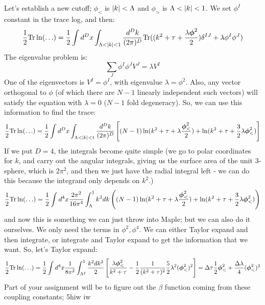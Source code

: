 Let's establish a new cutoff; $\phi_<$ is $\lvert k \rvert < \Lambda$ and $\phi_>$ is $\Lambda < \lvert k \rvert < 1$. We set $\phi^I$ constant in the trace log, and then:
\begin{equation}
    \frac{1}{2}\Tr \ln (\ldots) = \frac{1}{2}\int d^Dx \int_{\Lambda < \abs{k} < 1} \frac{d^Dk}{(2\pi)^D}\Tr((k^2 + \tau + \frac{\lambda\gv{\phi}^2}{2})\delta^{IJ} + \lambda\phi^I\phi^J)
\end{equation}
The eigenvalue problem is:
\begin{equation}
    \sum_J \phi^I \phi^J V^J = \lambda V^I
\end{equation}
One of the eigenvectors is $V^I = \phi^I$, with eigenvalue $\lambda = \phi^2$. Also, any vector orthogonal to $\phi$ (of which there are $N - 1$ linearly independent such vectors) will satisfy the equation with $\lambda = 0$ ($N-1$ fold degeneracy). So, we can use this information to find the trace:
\begin{equation}
    \frac{1}{2}\Tr \ln (\ldots) = \frac{1}{2}\int d^Dx \int_{\Lambda < \abs{k} < 1} \frac{d^Dk}{(2\pi)^D}\left[(N-1)\ln(k^2 + \tau + \lambda\frac{\gv{\phi}_<^2}{2}) + \ln(k^2 + \tau + \frac{3}{2}\lambda \gv{\phi}_<^2)\right]
\end{equation}
If we put $D = 4$, the integrals become quite simple (we go to polar coordinates for $k$, and carry out the angular integrals, giving us the surface area of the unit $3$-sphere, which is $2\pi^2$, and then we just have the radial integral left - we can do this because the integrand only depends on $k^2$.)
\begin{equation}
    \frac{1}{2}\Tr \ln (\ldots) = \frac{1}{2}\int d^4x \frac{2\pi^2}{16\pi^4} \int_\Lambda^1 k^3 dk \left((N-1)\ln(k^2 + \tau + \lambda\frac{\gv{\phi}_<^2}{2}) + \ln(k^2 + \tau + \frac{3}{2}\lambda \gv{\phi}_<^2)\right)
\end{equation}
and now this is something we can just throw into Maple; but we can also do it ourselves. We only need the terms in $\phi^2, \phi^4$. We can either Taylor expand and then integrate, or integrate and Taylor expand to get the information that we want. So, let's Taylor expand:
\begin{equation}
    \frac{1}{2}\Tr \ln (\ldots) = \frac{1}{2}\int d^4x \frac{1}{8\pi^2}\int_{\Lambda^2}^1 \frac{k^2dk^2}{2} \left[\frac{\lambda \gv{\phi}_<^2}{k^2 + \tau} - \frac{1}{2}\frac{1}{(k^2 + \tau)^2}\frac{5}{2}\lambda^2(\gv{\phi}_<^2)^2\right] = \Delta \tau \frac{1}{2}\gv{\phi}_<^2 + \frac{\Delta \lambda}{4}(\gv{\phi}_<^2)^2
\end{equation}
Part of your assignment will be to figure out the $\beta$ function coming from these coupling constants; 5hiw iw 